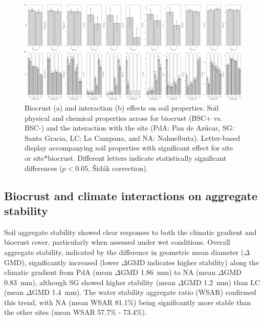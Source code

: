 \begin{figure}
    \centering
    \includegraphics[width=1\textwidth]{img/baseline_by_biocrust_interaction.png}
    \caption{Biocrust (a) and interaction (b) effects on soil properties. Soil physical and chemical properties across for biocrust (BSC+ vs. BSC-) and the interaction with the site (PdA: Pan de Azúcar, SG: Santa Gracia, LC: La Campana, and NA: Nahuelbuta). Letter-based display accompanying soil properties with significant effect for site or site*biocrust. Different letters indicate statistically significant differences ($p < 0.05$, Šidák correction).} %
    \label{fig:baseline_biocrust_interaction}
\end{figure} %

\FloatBarrier

\subsection{Biocrust and climate interactions on aggregate stability}
\label{sec:BiocrusClimateInducedSoil}

Soil aggregate stability showed clear responses to both the climatic gradient and biocrust cover, particularly when assessed under wet conditions. Overall aggregate stability, indicated by the difference in geometric mean diameter ($\Delta$GMD), significantly increased (lower $\Delta$GMD indicates higher stability) along the climatic gradient from PdA (mean $\Delta$GMD \SI{1.86}{\milli\meter}) to NA (mean $\Delta$GMD \SI{0.83}{\milli\meter}), although SG showed higher stability (mean $\Delta$GMD \SI{1.2}{\milli\meter}) than LC (mean $\Delta$GMD \SI{1.4}{\milli\meter}). The water stability aggregate ratio (WSAR) confirmed this trend, with NA (mean WSAR 81.1\%) being significantly more stable than the other sites (mean WSAR 57.7\% - 73.4\%).

